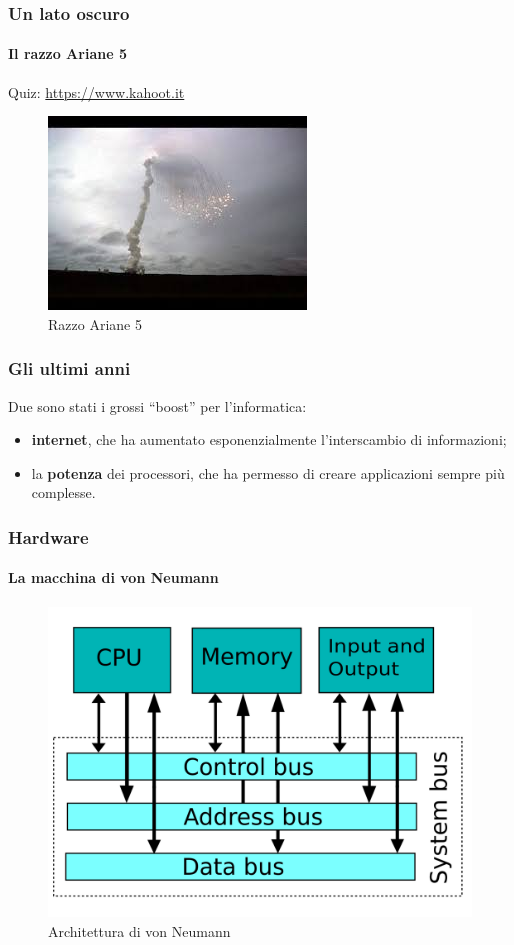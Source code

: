 \documentclass[11pt]{beamer}
\begin{document}
    \begin{frame}
        \frametitle{Un lato oscuro}
        \framesubtitle{Il razzo Ariane 5}

        \centering
        Quiz: \href{https://www.kahoot.it}{https://www.kahoot.it}

        \begin{figure}
            \includegraphics[scale=0.7]{img/ariane-5-explosion.jpg}
            \caption{Razzo Ariane 5}
        \end{figure}
    \end{frame}

    \begin{frame}
        \frametitle{Gli ultimi anni}

        Due sono stati i grossi ``boost'' per l'informatica:

        \begin{itemize}
            \item \textbf{internet}, che ha aumentato esponenzialmente l'interscambio di informazioni;
            \item la \textbf{potenza} dei processori, che ha permesso di creare applicazioni sempre più complesse.
        \end{itemize}
    \end{frame}

    \begin{frame}
        \frametitle{Hardware}
        \framesubtitle{La macchina di von Neumann}

        \begin{figure}
            \includegraphics[scale=0.15]{img/macchina-von-neumann.png}
            \caption{Architettura di von Neumann}
        \end{figure}
    \end{frame}
\end{document}
